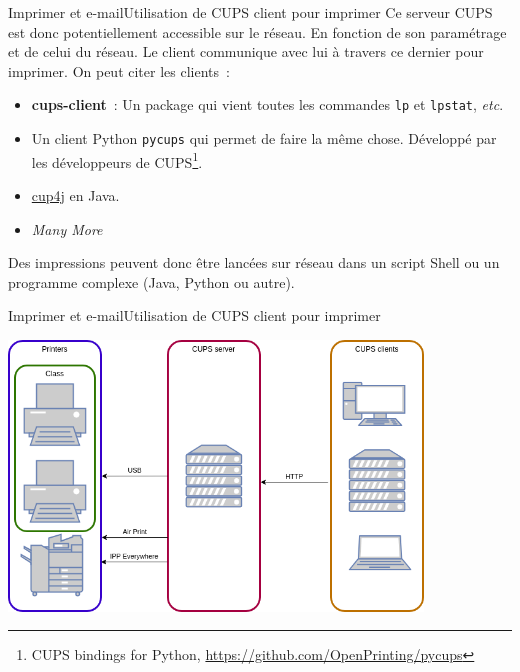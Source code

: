 \documentclass{beamer}
\begin{document}
    \begin{frame}{Imprimer et e-mail}{Utilisation de CUPS client pour imprimer}
        Ce serveur CUPS est donc potentiellement accessible sur le réseau.
        En fonction de son paramétrage et de celui du réseau.
        \bigbreak
        Le client communique avec lui à travers ce dernier pour imprimer.
        On peut citer les clients~:
        \begin{itemize}
            \item \textbf{cups-client}~: Un package qui vient toutes les commandes \lstinline{lp} et \lstinline{lpstat}, \textit{etc}.
            \item Un client Python \lstinline{pycups} qui permet de faire la même chose. Développé par les développeurs de CUPS\footnote{CUPS bindings for Python, \url{https://github.com/OpenPrinting/pycups}}.
            \item \href{https://github.com/harwey/cups4j}{cup4j} en Java.
            \item \textit{Many More}
        \end{itemize}
        Des impressions peuvent donc être lancées sur réseau dans un script Shell ou un programme complexe (Java, Python ou autre).
    \end{frame}

    \begin{frame}{Imprimer et e-mail}{Utilisation de CUPS client pour imprimer}
        \begin{center}
            \includegraphics[width=11cm]{image/cups.drawio}
        \end{center}
    \end{frame}
\end{document}
